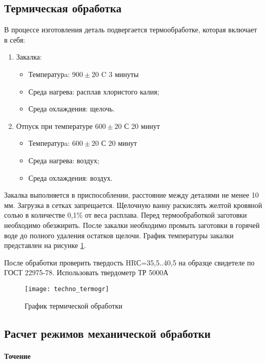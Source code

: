 \subsection{Термическая обработка}
В процессе изготовления деталь подвергается термообработке, которая включает в себя:
\begin{enumerate}[1.]
	\item Закалка:
	\begin{itemize}
		\item Температурa: $900 \pm 20$ \textdegree C 3 минуты
		\item Среда нагрева: расплав хлористого калия;
		\item Среда охлаждения: щелочь.
	\end{itemize}
	\item Отпуск при температуре $600 \pm 20 $ \textdegree С 20 минут
	\begin{itemize}
		\item Температурa: $ 600 \pm 20 $ \textdegree С 20 минут
		\item Среда нагрева: воздух;
		\item Среда охлаждения: воздух.
	\end{itemize}
\end{enumerate}

Закалка выполняется в приспособлении, расстояние между деталями не менее 10 мм. Загрузка в сетках запрещается. Щелочную ванну раскислять желтой кровяной солью в количестве 0,1\% от веса расплава. Перед термообработкой заготовки необходимо обезжирить. После закалки необходимо промыть заготовки в горячей воде до полного удаления остатков щелочи. График температуры закалки представлен на рисунке \ref{fig:techno_termogr}.

После обработки проверить твердость HRС=35,5..40,5 на образце свидетеле по ГОСТ 22975-78. Использовать твердометр ТР 5000А

\begin{figure}[h]
	\texttt{[image: techno\_termogr]}
	\caption{График термической обработки}
	\label{fig:techno_termogr}
\end{figure}

\subsection{Расчет режимов механической обработки}

\paragraph{Точение}

